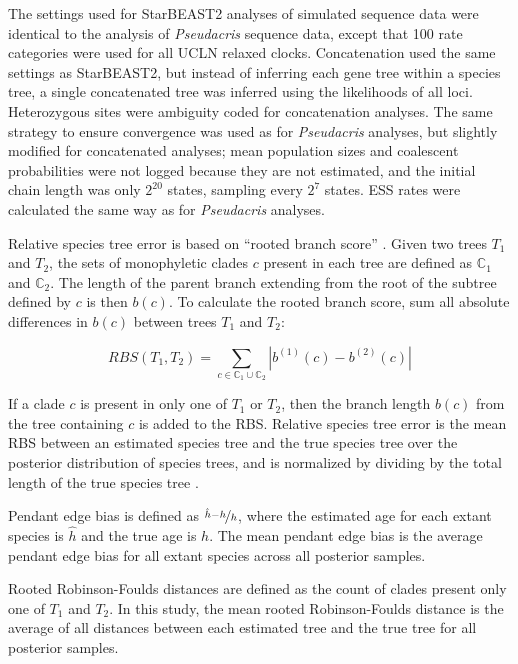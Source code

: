 \documentclass[12pt]{article}
\begin{document}
The settings used for StarBEAST2 analyses of simulated sequence data were
identical to the analysis of \textit{Pseudacris} sequence data, except that 100
rate categories were used for all UCLN relaxed clocks. Concatenation used the
same settings as StarBEAST2, but instead of inferring each gene tree within a
species tree, a single concatenated tree was inferred using the likelihoods of
all loci. Heterozygous sites were ambiguity coded for concatenation analyses.
The same strategy to ensure convergence was used as for \textit{Pseudacris}
analyses, but slightly modified for concatenated analyses; mean population sizes and
coalescent probabilities were not logged because they are not
estimated, and the initial chain length was only $2^{20}$ states, sampling every
$2^{7}$ states. ESS rates were calculated the same way as for
\textit{Pseudacris} analyses.

Relative species tree error is based on ``rooted branch score''
\citep[RBS;][]{Heled2013}. Given two trees $T_1$ and $T_2$, the sets of
monophyletic clades $c$ present in each tree are defined as $\mathbb{C}_1$ and
$\mathbb{C}_2$. The length of the parent branch extending from the root of the
subtree defined by $c$ is then $b(c)$. To calculate the rooted branch score, sum
all absolute differences in $b(c)$ between trees $T_1$ and $T_2$:

\begin{equation}
RBS(T_1, T_2) = \sum_{c \in {\mathbb{C}_1} \cup {\mathbb{C}_2}} |b^{(1)}(c) - b^{(2)}(c)|
\end{equation}

If a clade $c$ is present in only one of $T_1$ or $T_2$, then the branch length
$b(c)$ from the tree containing $c$ is added to the RBS. Relative species tree
error is the mean RBS between an estimated species tree and the true
species tree over the posterior distribution of species trees, and is normalized
by dividing by the total length of the true species tree
\citep{Ogilvie01052016}.

Pendant edge bias is defined as $\nicefrac{\hat{h} - h}{h}$, where the estimated
age for each extant species is $\hat{h}$ and the true age is $h$. The mean
pendant edge bias is the average pendant edge bias for all extant species across
all posterior samples.

Rooted Robinson-Foulds distances \citep{ROBINSON1981131} are defined as the
count of clades present only one of $T_1$ and $T_2$. In this study, the mean
rooted Robinson-Foulds distance is the average of all distances between each
estimated tree and the true tree for all posterior samples.
\end{document}
